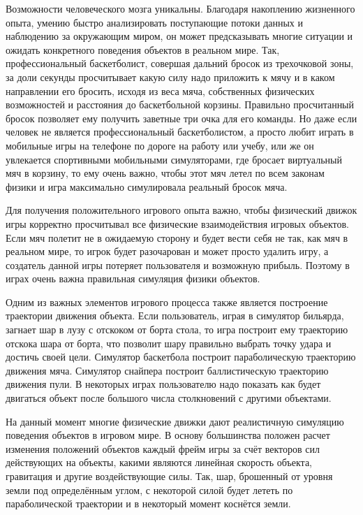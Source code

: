 \label{sec:intro}
Возможности человеческого мозга уникальны. Благодаря накоплению жизненного опыта, умению быстро анализировать поступающие потоки данных и наблюдению за окружающим миром, он может предсказывать многие ситуации и ожидать конкретного поведения объектов в реальном мире. Так, профессиональный баскетболист, совершая дальний бросок из трехочковой зоны, за доли секунды просчитывает какую силу надо приложить к мячу и в каком направлении его бросить, исходя из веса мяча, собственных физических возможностей и расстояния до баскетбольной корзины. Правильно просчитанный бросок позволяет ему получить заветные три очка для его команды. Но даже если человек не является профессиональный баскетболистом, а просто любит играть в мобильные игры на телефоне по дороге на работу или учебу, или же он увлекается спортивными мобильными симуляторами, где бросает виртуальный мяч в корзину, то ему очень важно, чтобы этот мяч летел по всем законам физики и игра максимально симулировала реальный бросок мяча. 

Для получения положительного игрового опыта важно, чтобы физический движок игры корректно просчитывал все физические взаимодействия игровых объектов. Если мяч полетит не в ожидаемую сторону и будет вести себя не так, как мяч в реальном мире, то игрок будет разочарован и может просто удалить игру, а создатель данной игры потеряет пользователя и возможную прибыль. Поэтому в играх очень важна правильная симуляция физики объектов.

Одним из важных элементов игрового процесса также является построение траектории движения объекта. Если пользователь, играя в симулятор бильярда, загнает шар в лузу с отскоком от борта стола, то игра построит ему траекторию отскока шара от борта, что позволит шару правильно выбрать точку удара и достичь своей цели. Симулятор баскетбола построит параболическую траекторию движения мяча. Симулятор снайпера построит баллистическую траекторию движения пули.  В некоторых играх пользователю надо показать как будет двигаться объект после большого числа столкновений с другими объектами. 

На данный момент многие физические движки дают реалистичную симуляцию поведения объектов в игровом мире. В основу большинства положен расчет изменения положений объектов каждый фрейм игры за счёт векторов сил действующих на объекты, какими являются линейная скорость объекта, гравитация и другие воздействующие силы. Так, шар, брошенный от уровня земли под определённым углом, с некоторой силой будет лететь по параболической траектории и в некоторый момент коснётся земли. 

